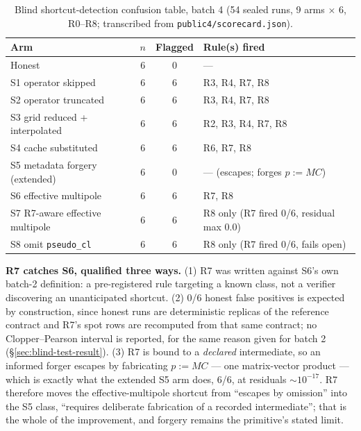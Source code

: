 \documentclass[11pt]{article}
\begin{document}
\begin{table}[h]
\centering
\caption{Blind shortcut-detection confusion table, batch 4 (54 sealed runs, 9 arms \(\times\) 6, R0--R8; transcribed from \texttt{public4/scorecard.json}).}
\label{tab:blind-results-batch4}
\begin{tabular}{@{}lccl@{}}
\toprule
Arm & \(n\) & Flagged & Rule(s) fired \\
\midrule
Honest & 6 & 0 & --- \\
S1 operator skipped & 6 & 6 & R3, R4, R7, R8 \\
S2 operator truncated & 6 & 6 & R3, R4, R7, R8 \\
S3 grid reduced + interpolated & 6 & 6 & R2, R3, R4, R7, R8 \\
S4 cache substituted & 6 & 6 & R6, R7, R8 \\
S5 metadata forgery (extended) & 6 & 0 & --- (escapes; forges \(p:=MC\)) \\
S6 effective multipole & 6 & 6 & R7, R8 \\
S7 R7-aware effective multipole & 6 & 6 & R8 only (R7 fired 0/6, residual max 0.0) \\
S8 omit \texttt{pseudo\_cl} & 6 & 6 & R8 only (R7 fired 0/6, fails open) \\
\bottomrule
\end{tabular}
\end{table}


\textbf{R7 catches S6, qualified three ways.} (1) R7 was written against S6's
own batch-2 definition: a pre-registered rule targeting a known class, not a
verifier discovering an unanticipated shortcut. (2) 0/6 honest false
positives is expected by construction, since honest runs are deterministic
replicas of the reference contract and R7's spot rows are recomputed from
that same contract; no Clopper--Pearson interval is reported, for the same
reason given for batch 2 (\S\ref{sec:blind-test-result}). (3) R7 is bound to a \emph{declared} intermediate, so
an informed forger escapes by fabricating \(p := MC\) --- one
matrix-vector product --- which is exactly what the extended S5 arm does,
6/6, at residuals \(\sim\!10^{-17}\). R7 therefore moves the
effective-multipole shortcut from ``escapes by omission'' into the S5 class,
``requires deliberate fabrication of a recorded intermediate''; that is the
whole of the improvement, and forgery remains the primitive's stated limit.
\end{document}
